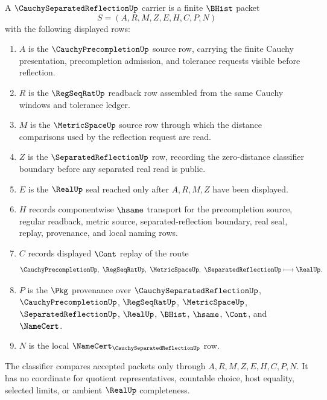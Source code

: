 \begin{definition}
\label{def:cauchy-separated-reflection-carrier}
A $\CauchySeparatedReflectionUp$ carrier is a finite $\BHist$ packet
$$
S=(A,R,M,Z,E,H,C,P,N)
$$
with the following displayed rows:
\begin{enumerate}
\item $A$ is the $\CauchyPrecompletionUp$ source row, carrying the finite Cauchy presentation, precompletion admission, and tolerance requests visible before reflection.
\item $R$ is the $\RegSeqRatUp$ readback row assembled from the same Cauchy windows and tolerance ledger.
\item $M$ is the $\MetricSpaceUp$ source row through which the distance comparisons used by the reflection request are read.
\item $Z$ is the $\SeparatedReflectionUp$ row, recording the zero-distance classifier boundary before any separated real read is public.
\item $E$ is the $\RealUp$ seal reached only after $A,R,M,Z$ have been displayed.
\item $H$ records componentwise $\hsame$ transport for the precompletion source, regular readback, metric source, separated-reflection boundary, real seal, replay, provenance, and local naming rows.
\item $C$ records displayed $\Cont$ replay of the route
$$
\CauchyPrecompletionUp,\ \RegSeqRatUp,\ \MetricSpaceUp,\ \SeparatedReflectionUp \longmapsto \RealUp .
$$
\item $P$ is the $\Pkg$ provenance over $\CauchySeparatedReflectionUp$, $\CauchyPrecompletionUp$, $\RegSeqRatUp$, $\MetricSpaceUp$, $\SeparatedReflectionUp$, $\RealUp$, $\BHist$, $\hsame$, $\Cont$, and $\NameCert$.
\item $N$ is the local $\NameCert_{\CauchySeparatedReflectionUp}$ row.
\end{enumerate}
The classifier compares accepted packets only through $A,R,M,Z,E,H,C,P,N$. It has no coordinate for quotient representatives, countable choice, host equality, selected limits, or ambient $\RealUp$ completeness.
\end{definition}

